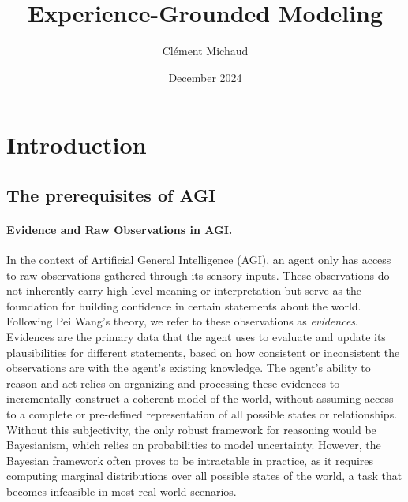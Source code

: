 \documentclass{article}
\title{Experience-Grounded Modeling}
\author{Clément Michaud}
\date{December 2024}
\begin{document}
\maketitle

\section{Introduction}

\subsection{The prerequisites of AGI}

\paragraph{Evidence and Raw Observations in AGI.}
In the context of Artificial General Intelligence (AGI), an agent only has access to raw observations gathered through its sensory inputs. These observations do not inherently carry high-level meaning or interpretation but serve as the foundation for building confidence in certain statements about the world. Following Pei Wang's theory, we refer to these observations as \textit{evidences}. Evidences are the primary data that the agent uses to evaluate and update its plausibilities for different statements, based on how consistent or inconsistent the observations are with the agent's existing knowledge. The agent's ability to reason and act relies on organizing and processing these evidences to incrementally construct a coherent model of the world, without assuming access to a complete or pre-defined representation of all possible states or relationships. Without this subjectivity, the only robust framework for reasoning would be Bayesianism, which relies on probabilities to model uncertainty. However, the Bayesian framework often proves to be intractable in practice, as it requires computing marginal distributions over all possible states of the world, a task that becomes infeasible in most real-world scenarios.
\end{document}
